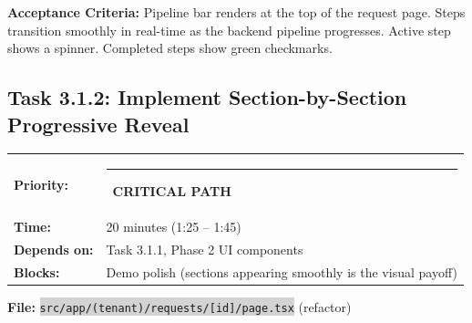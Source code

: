 \documentclass[11pt, a4paper]{article}
\newcommand{\critical}{\textcolor{critred}{\rule{6pt}{6pt}}~\textcolor{critred}{\scriptsize\textbf{CRITICAL PATH}}}
\newcommand{\code}[1]{\texttt{\small\colorbox{lightgray}{#1}}}
\begin{document}
\textbf{Acceptance Criteria:} Pipeline bar renders at the top of the request page. Steps transition smoothly in real-time as the backend pipeline progresses. Active step shows a spinner. Completed steps show green checkmarks.

\vspace{1em}

\subsection{Task 3.1.2: Implement Section-by-Section Progressive Reveal}

\begin{tabularx}{\textwidth}{lX}
\textbf{Priority:} & \critical \\
\textbf{Time:} & 20 minutes (1:25 -- 1:45) \\
\textbf{Depends on:} & Task 3.1.1, Phase 2 UI components \\
\textbf{Blocks:} & Demo polish (sections appearing smoothly is the visual payoff) \\
\end{tabularx}

\vspace{0.3em}

\textbf{File:} \code{src/app/(tenant)/requests/[id]/page.tsx} (refactor)
\end{document}
